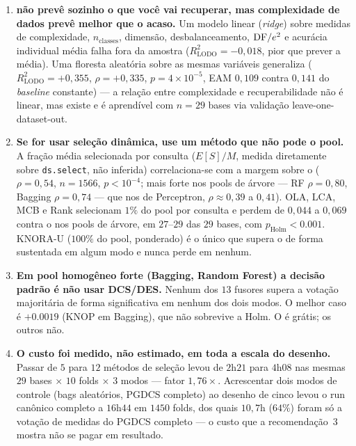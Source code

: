 \begin{enumerate}
\noindent
\textbf{Sobre o denominador.} $e^{2}$ com $e$ médio só é o valor esperado sob
independência se todos os classificadores errarem na mesma taxa; o exato é
$\frac{2}{M(M-1)}\sum_{i<j} e_i e_j$. Recalculado a partir das acurácias individuais
já gravadas por fold, o índice exato desloca a correlação de $-0.8869$ para
$-0.8878$ e melhora a validação fora da amostra de $0{,}834$ para $0{,}855$, com os
limiares caindo em $1{,}23$ e $4{,}16$. A razão entre os dois índices tem mediana
$1{,}0006$, porque o desvio médio das acurácias individuais dentro de um pool é
pequeno ($0{,}064$). A correção melhora o rigor e, desta vez, também a validação
fora da amostra --- não é só estética.

\item \textbf{\dfe{} não prevê sozinho o que você vai recuperar, mas complexidade
de dados prevê melhor que o acaso.} Um modelo linear (\emph{ridge}) sobre medidas de
complexidade, $n_{\text{classes}}$, dimensão, desbalanceamento, $\mathrm{DF}/e^{2}$ e acurácia
individual média falha fora da amostra ($R^2_{\text{LODO}}=-0{,}018$, pior que prever
a média). Uma floresta aleatória sobre as mesmas variáveis generaliza
($R^2_{\text{LODO}}=+0{,}355$, $\rho=+0{,}335$, $p=4\times10^{-5}$, EAM $0{,}109$
contra $0{,}141$ do \emph{baseline} constante) --- a relação entre complexidade e
recuperabilidade não é linear, mas existe e é aprendível com $n=29$ bases via
validação leave-one-dataset-out.

\item \textbf{Se for usar seleção dinâmica, use um método que não pode o pool.} A
fração média selecionada por consulta ($E[S]/M$, medida diretamente sobre
\texttt{ds.select}, não inferida) correlaciona-se com a margem sobre o \mvr{}
($\rho=0{,}54$, $n=1566$, $p<10^{-4}$; mais forte nos pools de árvore --- RF
$\rho=0{,}80$, Bagging $\rho=0{,}74$ --- que nos de Perceptron, $\rho\approx0{,}39$
a $0{,}41$). OLA, LCA, MCB e Rank selecionam $1\%$ do pool por consulta e perdem de
$0{,}044$ a $0{,}069$ contra o \mvr{} nos pools de árvore, em $27$--$29$ das $29$
bases, com $p_{\text{Holm}}<0.001$. KNORA-U ($100\%$ do pool, ponderado) é o único
que supera o \mvr{} de forma sustentada em algum modo e nunca perde em nenhum.

\item \textbf{Em pool homogêneo forte (Bagging, Random Forest) a decisão padrão é
não usar DCS/DES.} Nenhum dos $13$ fusores supera a votação majoritária de forma
significativa em nenhum dos dois modos. O melhor caso é $+0.0019$ (KNOP em Bagging),
que não sobrevive a Holm. O \mvr{} é grátis; os outros não.

\item \textbf{O custo foi medido, não estimado, em toda a escala do desenho.}
Passar de $5$ para $12$ métodos de seleção levou de $2$h$21$ para $4$h$08$ nas
mesmas $29$ bases $\times$ $10$ folds $\times$ $3$ modos --- fator $1{,}76\times$.
Acrescentar dois modos de controle (bags aleatórios, PGDCS completo) ao desenho de
cinco levou o run canônico completo a $16$h$44$ em $1450$ folds, dos quais $10{,}7$h
($64\%$) foram só a votação de medidas do PGDCS completo --- o custo que a
recomendação~3 mostra não se pagar em resultado.
\end{enumerate}
